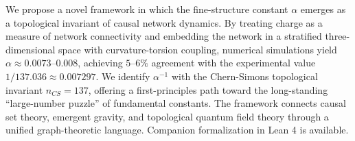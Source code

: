 
We propose a novel framework in which the fine-structure constant $\alpha$
emerges as a topological invariant of causal network dynamics. By treating
charge as a measure of network connectivity and embedding the network in a
stratified three-dimensional space with curvature-torsion coupling, numerical
simulations yield $\alpha \approx 0.0073\text{--}0.008$, achieving $5\text{--}6\%$
agreement with the experimental value $1/137.036 \approx 0.007297$. We identify
$\alpha^{-1}$ with the Chern-Simons topological invariant $n_{CS} = 137$,
offering a first-principles path toward the long-standing ``large-number puzzle''
of fundamental constants. The framework connects causal set theory, emergent
gravity, and topological quantum field theory through a unified graph-theoretic
language. Companion formalization in Lean 4 is available.
